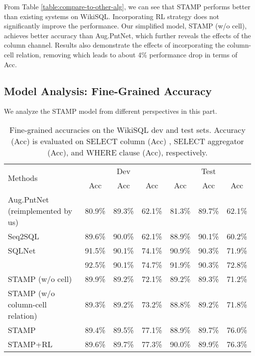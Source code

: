 \documentclass[11pt,a4paper]{article}
\begin{document}
From Table \ref{table:compare-to-other-alg}, we can see that STAMP performs better than existing systems on WikiSQL.
Incorporating RL strategy does not significantly improve the performance.
Our simplified model, STAMP (w/o cell), achieves better accuracy than Aug.PntNet,
which further reveals the effects of the column channel.
Results also demonstrate the effects of incorporating the column-cell relation, removing which leads to about 4\% performance drop in terms of Acc.

\subsection{Model Analysis: Fine-Grained Accuracy}
We analyze the STAMP model from different perspectives in this part.

\begin{table*}[t]
\centering
	\begin{tabular}{l|ccc|ccc}
		\hline
		\multirow{2}{*}{Methods} & \multicolumn{3}{c|}{Dev} & \multicolumn{3}{c}{Test} \\
		\cline{2-7}
		& {Acc} & {Acc} & Acc & {Acc} & {Acc}& Acc\\
		\hline
		Aug.PntNet (reimplemented by us) & 80.9\%& 89.3\%& 62.1\%& 81.3\%& 89.7\%& 62.1\%\\
		Seq2SQL~\cite{zhong2017seq2sql} & 89.6\%& 90.0\%& 62.1\%& 88.9\%& 90.1\%& 60.2\%\\
		SQLNet~\cite{xu2017sqlnet} & 91.5\% & 90.1\%& 74.1\%& 90.9\% & 90.3\%& 71.9\%\\
 		\newcite{DBLP:journals/corr/abs-1801-00076} & 92.5\% & 90.1\% & 74.7\%& 91.9\%& 90.3\%& 72.8\% \\
		
\hline


		STAMP  (w/o cell)& 89.9\%& 89.2\%& 72.1\%& 89.2\%& 89.3\%& 71.2\%\\
STAMP  (w/o column-cell relation) & 89.3\%& 89.2\%& 73.2\%& 88.8\%& 89.2\%& 71.8\%\\
		STAMP  & 89.4\%& 89.5\%& 77.1\%& 88.9\%& 89.7\%& 76.0\%\\
		STAMP+RL& 89.6\%&  89.7\%& 77.3\%&  90.0\%&  89.9\%& 76.3\%\\
		\hline
	\end{tabular}
	\caption{Fine-grained accuracies on the WikiSQL dev and test sets. Accuracy (Acc) is evaluated on SELECT column (Acc) , SELECT aggregator (Acc), and WHERE clause (Acc), respectively. }
	\label{table:fine-grained-results}
\end{table*}
\end{document}
